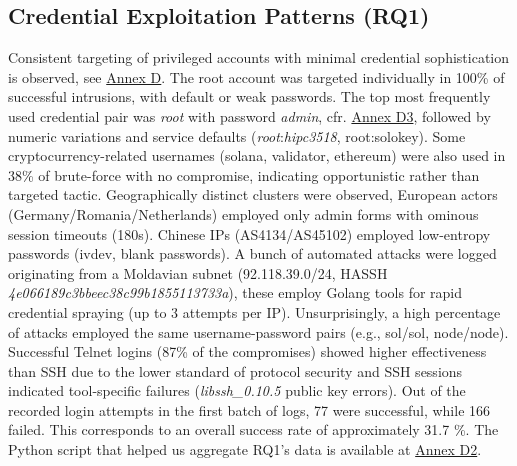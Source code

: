 \documentclass{cls/ULBreport}
\begin{document}
\subsection{Credential Exploitation Patterns (RQ1)}
Consistent targeting of privileged accounts with minimal credential sophistication is observed, see \hyperref[annex:log-credential1]{Annex D}. The root account was targeted individually in 100{\%} of successful intrusions, with default or weak passwords. The top most frequently used credential pair was \textit{root} with password \textit{admin}, cfr. \hyperref[annex:log-credential2]{Annex D3}, followed by numeric variations and service defaults (\textit{root}:\textit{hipc3518}, root:solokey). Some cryptocurrency-related usernames (solana, validator, ethereum) were also used in 38{\%} of brute-force with no compromise, indicating opportunistic rather than targeted tactic. Geographically distinct clusters were observed, European actors (Germany/Romania/Netherlands) employed only admin forms with ominous session timeouts (180s). Chinese IPs (AS4134/AS45102) employed low-entropy passwords (ivdev, blank passwords). A bunch of automated attacks were logged originating from a Moldavian subnet (92.118.39.0/24, HASSH \textit{4e066189c3bbeec38c99b1855113733a}), these employ Golang tools for rapid credential spraying (up to 3 attempts per IP). Unsurprisingly, a high percentage of attacks employed the same username-password pairs (e.g., sol/sol, node/node). Successful Telnet logins (87{\%} of the compromises) showed higher effectiveness than SSH due to the lower standard of protocol security and SSH sessions indicated tool-specific failures (\textit{libssh\_0.10.5} public key errors). Out of the recorded login attempts in the first batch of logs, 77 were successful, while 166 failed. This corresponds to an overall success rate of approximately 31.7 {\%}. The Python script that helped us aggregate RQ1's data is available at \hyperref[annex:log-persistence2]{Annex D2}.
\end{document}
